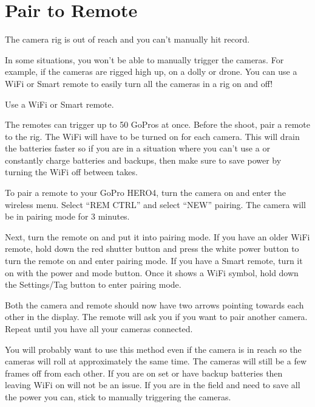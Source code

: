\section{Pair to Remote}
\pagecolor{white}
\label{chap:09}
\begin{fullwidth}

\problem

{\large The camera rig is out of reach and you can’t manually hit record. \par}

In some situations, you won’t be able to manually trigger the cameras. For example, if the cameras are rigged high up, on a dolly or drone. You can use a WiFi or Smart remote to easily turn all the cameras in a rig on and off!

\solution

{\large Use a WiFi or Smart remote. \par}

The remotes can trigger up to 50 GoPros at once. Before the shoot, pair a remote to the rig. The WiFi will have to be turned on for each camera. This will drain the batteries faster so if you are in a situation where you can’t use a \textbf{} or constantly charge batteries and backups, then make sure to save power by turning the WiFi off between takes. 

To pair a remote to your GoPro HERO4, turn the camera on and enter the wireless menu. Select “REM CTRL” and select “NEW” pairing. The camera will be in pairing mode for 3 minutes.


Next, turn the remote on and put it into pairing mode. If you have an older WiFi remote, hold down the red shutter button and press the white power button to turn the remote on and enter pairing mode. If you have a Smart remote, turn it on with the power and mode button. Once it shows a WiFi symbol, hold down the Settings/Tag button to enter pairing mode. 


Both the camera and remote should now have two arrows pointing towards each other in the display. The remote will ask you if you want to pair another camera. Repeat until you have all your cameras connected.


You will probably want to use this method even if the camera is in reach so the cameras will roll at approximately the same time. The cameras will still be a few frames off from each other. If you are on set or have backup batteries then leaving WiFi on will not be an issue. If you are in the field and need to save all the power you can, stick to manually triggering the cameras. 



\clearpage
\end{fullwidth}
